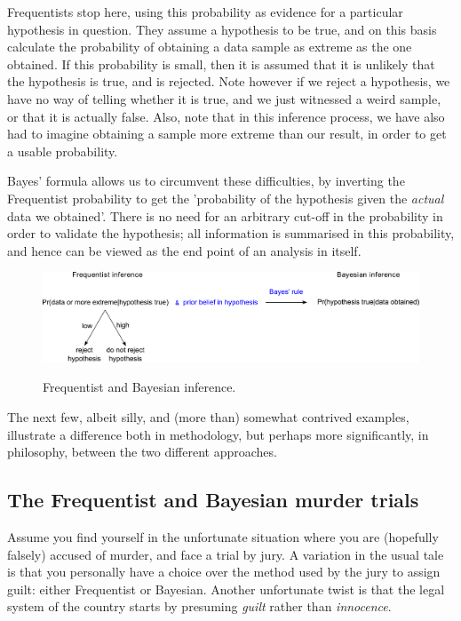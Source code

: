 \documentclass[11pt,fullpage]{book}
\begin{document}
Frequentists stop here, using this probability as evidence for a particular hypothesis in question. They assume a hypothesis to be true, and on this basis calculate the probability of obtaining a data sample as extreme as the one obtained. If this probability is small, then it is assumed that it is unlikely that the hypothesis is true, and is rejected. Note however if we reject a hypothesis, we have no way of telling whether it is true, and we just witnessed a weird sample, or that it is actually false. Also, note that in this inference process, we have also had to imagine obtaining a sample more extreme than our result, in order to get a usable probability. 

Bayes' formula allows us to circumvent these difficulties, by inverting the Frequentist probability to get the 'probability of the hypothesis given the \textit{actual} data we obtained'. There is no need for an arbitrary cut-off in the probability in order to validate the hypothesis; all information is summarised in this probability, and hence can be viewed as the end point of an analysis in itself.

\begin{figure}
\centering
\scalebox{0.4} 
{\includegraphics{Intro_BayesVsFrequentist.pdf}}
\caption{Frequentist and Bayesian inference.}\label{fig:Intro_BayesVsFrequentist}
\end{figure}

The next few, albeit silly, and (more than) somewhat contrived examples, illustrate a difference both in methodology, but perhaps more significantly, in philosophy, between the two different approaches.

\subsection{The Frequentist and Bayesian murder trials}
Assume you find yourself in the unfortunate situation where you are (hopefully falsely) accused of murder, and face a trial by jury. A variation in the usual tale is that you personally have a choice over the method used by the jury to assign guilt: either Frequentist or Bayesian. Another unfortunate twist is that the legal system of the country starts by presuming \textit{guilt} rather than \textit{innocence}.
\end{document}
